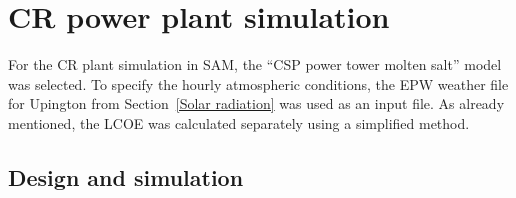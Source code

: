 \chapter{CR power plant simulation}
For the CR plant simulation in SAM, the \enquote{CSP power tower molten salt} model was selected. To specify the hourly atmospheric conditions, the EPW weather file for Upington from Section~\ref{Solar radiation} was used as an input file. As already mentioned, the LCOE was calculated separately using a simplified method.

\section{Design and simulation} \label{CR power plant design  and simulation}


